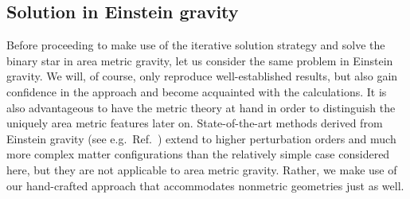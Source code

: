 \subsection{Solution in Einstein gravity}\label{section_einstein_waves}
Before proceeding to make use of the iterative solution strategy and solve the binary star in area metric gravity, let us consider the same problem in Einstein gravity. We will, of course, only reproduce well-established results, but also gain confidence in the approach and become acquainted with the calculations. It is also advantageous to have the metric theory at hand in order to distinguish the uniquely area metric features later on. State-of-the-art methods derived from Einstein gravity (see e.g.~Ref.\ \cite{poisson2014gravity}) extend to higher perturbation orders and much more complex matter configurations than the relatively simple case considered here, but they are not applicable to area metric gravity. Rather, we make use of our hand-crafted approach that accommodates nonmetric geometries just as well.

